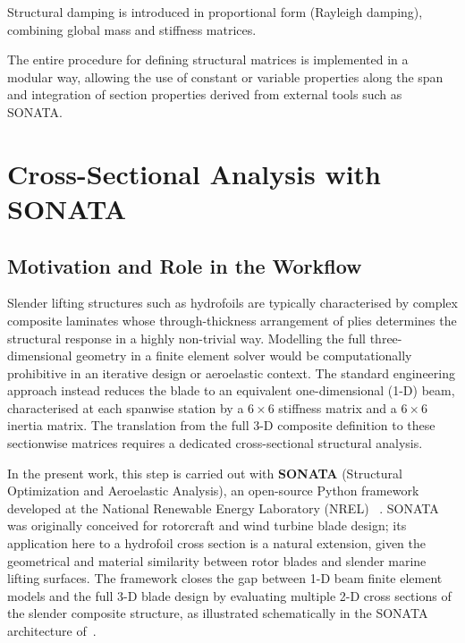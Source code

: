 Structural damping is introduced in proportional form (Rayleigh damping), combining global mass and stiffness matrices.

The entire procedure for defining structural matrices is implemented in a modular way, allowing the use of constant or variable properties along the span
and integration of section properties derived from external tools such as SONATA.

\section{Cross-Sectional Analysis with SONATA}
\label{sec:sonata}

\subsection{Motivation and Role in the Workflow}

Slender lifting structures such as hydrofoils are typically characterised by complex composite
laminates whose through-thickness arrangement of plies determines the structural response in a
highly non-trivial way.
Modelling the full three-dimensional geometry in a finite element solver would be computationally
prohibitive in an iterative design or aeroelastic context.
The standard engineering approach instead reduces the blade to an equivalent one-dimensional (1-D)
beam, characterised at each spanwise station by a $6\times6$ stiffness matrix and a $6\times6$
inertia matrix.
The translation from the full 3-D composite definition to these sectionwise matrices requires a
dedicated cross-sectional structural analysis.

In the present work, this step is carried out with \textbf{SONATA} (Structural Optimization and
Aeroelastic Analysis), an open-source Python framework developed at the National Renewable Energy
Laboratory (NREL) ~\cite{feil2020sonata}.
SONATA was originally conceived for rotorcraft and wind turbine blade design; its application
here to a hydrofoil cross section is a natural extension, given the geometrical and material
similarity between rotor blades and slender marine lifting surfaces.
The framework closes the gap between 1-D beam finite element models and the full 3-D blade
design by evaluating multiple 2-D cross sections of the slender composite structure, as
illustrated schematically in the SONATA architecture of~\cite{feil2020sonata}.

